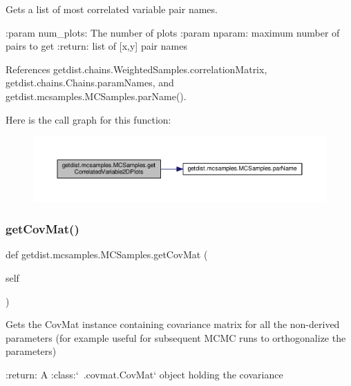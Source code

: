 \begin{DoxyVerb}Gets a list of most correlated variable pair names.

:param num_plots: The number of plots
:param nparam: maximum number of pairs to get
:return: list of [x,y] pair names
\end{DoxyVerb}
 

References getdist.\+chains.\+Weighted\+Samples.\+correlation\+Matrix, getdist.\+chains.\+Chains.\+param\+Names, and getdist.\+mcsamples.\+M\+C\+Samples.\+par\+Name().

Here is the call graph for this function\+:
\nopagebreak
\begin{figure}[H]
\begin{center}
\leavevmode
\includegraphics[width=350pt]{classgetdist_1_1mcsamples_1_1MCSamples_ab30ef86c7ea5a38b6f4104a5c9055bd8_cgraph}
\end{center}
\end{figure}
\mbox{\label{classgetdist_1_1mcsamples_1_1MCSamples_a2b52bd7f0fb69759e1170cec6b336c75}} 
\subsubsection{\texorpdfstring{get\+Cov\+Mat()}{getCovMat()}}
{\footnotesize\ttfamily def getdist.\+mcsamples.\+M\+C\+Samples.\+get\+Cov\+Mat (\begin{DoxyParamCaption}\item[{}]{self }\end{DoxyParamCaption})}

\begin{DoxyVerb}Gets the CovMat instance containing covariance matrix for all the non-derived parameters
(for example useful for subsequent MCMC runs to orthogonalize the parameters)

:return: A :class:`~.covmat.CovMat` object holding the covariance
\end{DoxyVerb}
 

